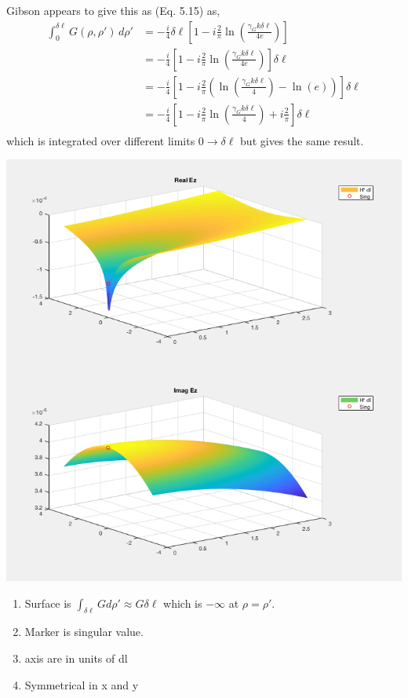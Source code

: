 \documentclass{article}
\newcommand{\0}{\varnothing}
\begin{document}
Gibson appears to give this as (Eq. 5.15) as,
\begin{align*}
    \int_0^{\delta\ell} G(\rho,\rho')\, d\rho' &=  - \frac{i}{4} \delta \ell \left[1 - i \frac{2}{\pi} \ln \left(\frac{\gamma_G k \delta \ell}{4e} \right) \right] \\
    &=  -\frac{i}{4} \left[1 - i \frac{2}{\pi} \ln \left(\frac{\gamma_G k \delta \ell}{4e} \right) \right] \delta \ell\\ 
    &=  -\frac{i}{4} \left[1 - i \frac{2}{\pi} \left( \ln \left(\frac{\gamma_G k \delta \ell}{4}\right) - \ln(e) \right) \right] \delta \ell\\ 
    &=  -\frac{i}{4} \left[1 - i \frac{2}{\pi} \ln \left(\frac{\gamma_G k \delta \ell}{4}\right) + i \frac{2}{\pi} \right] \delta \ell\\ 
\end{align*}
which is integrated over different limits $ 0 \rightarrow \delta \ell$ but gives the same result.

\begin{minipage}{0.5\textwidth}
{\centering
\includegraphics[width=0.95\columnwidth]{figures/GSingSurf2.png}
}
\end{minipage}
\begin{minipage}{0.5\textwidth}
\begin{enumerate}
    \item Surface is $\int_{\delta \ell} G d\rho' \approx G \delta \ell$ which is $-\infty$ at $\rho = \rho'$.
    \item Marker is singular value. 
    \item axis are in units of dl
    \item Symmetrical in x and y
\end{enumerate}
\end{minipage}
\end{document}
